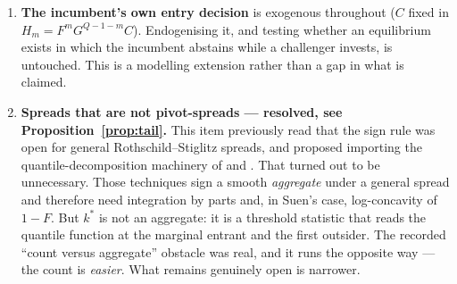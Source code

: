 \documentclass[11pt]{article}
\begin{document}
\begin{enumerate}
\item \textbf{The incumbent's own entry decision} is exogenous
  throughout ($C$ fixed in $H_m=F^mG^{Q-1-m}C$). Endogenising it, and
  testing whether an equilibrium exists in which the incumbent
  abstains while a challenger invests, is untouched. This is a
  modelling extension rather than a gap in what is claimed.
\item \textbf{Spreads that are not pivot-spreads --- resolved, see
  Proposition~\ref{prop:tail}.} This item previously read that the sign rule
  was open for general Rothschild--Stiglitz spreads, and proposed importing
  the quantile-decomposition machinery of \citet{CostrellLoury2004} and
  \citet{Suen2007}. That turned out to be unnecessary. Those techniques sign
  a smooth \emph{aggregate} under a general spread and therefore need
  integration by parts and, in Suen's case, log-concavity of $1-F$. But
  $k^*$ is not an aggregate: it is a threshold statistic that reads the
  quantile function at the marginal entrant and the first outsider. The recorded ``count versus
  aggregate'' obstacle was real, and it runs the opposite way --- the count
  is \emph{easier}. What remains genuinely open is narrower.


\end{enumerate}
\end{document}

